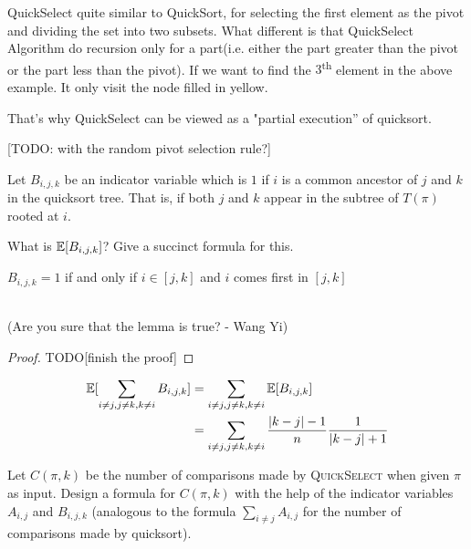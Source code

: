 \documentclass[11pt,a4paper,oneside]{article}
\newcommand{\nth}[1]{#1\textsuperscript{th}}
\newcommand{\E}{\mathop{\mathbb{E\/}}}
\begin{document}
\begin{problem}{5}
QuickSelect quite similar to QuickSort, for selecting the first element as the pivot and dividing the set into two subsets. What different is that QuickSelect Algorithm do recursion only for a part(i.e. either the part greater than the pivot or the part less than the pivot). If we want to find the \nth{\(3\)} element in the above example. It only visit the node filled in yellow.

That's why QuickSelect can be viewed as a "partial execution'' of quicksort.

[TODO: with the random pivot selection rule?]

\end{problem}

\begin{problem}{6}
\statement
Let $B_{i,j,k}$ be an indicator variable which is $1$ if $i$ is a common ancestor
of $j$ and $k$ in the quicksort tree. That is, if both $j$ and $k$ appear in the 
subtree of $T(\pi)$ rooted at $i$.

What is $\E[B_{i,j,k}]$? Give a succinct formula for this.

\solution
\begin{lemma}
	\(B_{i, j, k} = 1\) if and only if \(i \in [j, k]\) and \(i\) comes first in \([j, k]\)
\end{lemma}
\\(Are you sure that the lemma is true? - Wang Yi)
\begin{proof}
	TODO[finish the proof]
\end{proof}

\[
	\begin{split}
		\E[\sum_{i \not= j, j \not= k, k \not= i}B_{i, j, k}] &= \sum_{i \not= j, j \not= k, k \not= i} \E[B_{i,j,k}] \\
		&= \sum_{i \not= j, j \not= k, k \not= i} \frac{|k - j| - 1}{n} \frac{1}{|k - j| + 1} \\
	\end{split}
\]
\end{problem}

\begin{problem}{7}
\statement
Let $C(\pi,k)$ be the number of comparisons made by \textsc{QuickSelect} when given
$\pi$ as input. Design a formula for $C(\pi,k)$ with the help of the indicator
variables $A_{i,j}$ and $B_{i,j,k}$ (analogous to the formula 
$\sum_{i \ne j} A_{i,j}$ for the number of comparisons made by quicksort).
\end{problem}
\end{document}
